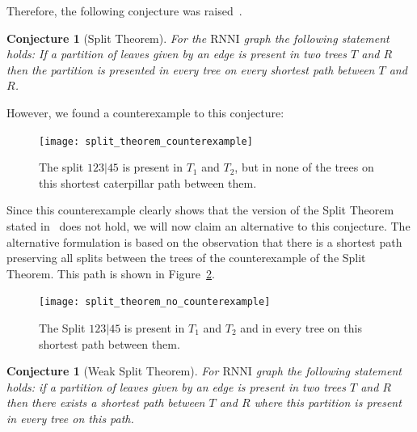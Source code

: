 \documentclass[11pt, a4paper]{article}
\newcommand{\rnni}{\mathrm{RNNI}}
\newtheorem{conjecture}[definition]{Conjecture}
\begin{document}
Therefore, the following conjecture was raised~\cite{Gavryushkin2017}.

\begin{conjecture}[Split Theorem]
	For the $\rnni$ graph the following statement holds:
	If a partition of leaves given by an edge is present in two trees $T$ and $R$ then the partition is presented in every tree on every shortest path between $T$ and $R$.
	\label{split_theorem}
\end{conjecture}

However, we found a counterexample to this conjecture:

\begin{figure}[H]
	\centering
	\texttt{[image: split\_theorem\_counterexample]}
	\caption{The split $123|45$ is present in $T_1$ and $T_2$, but in none of the trees on this shortest caterpillar path between them.}
	\label{split_theorem_counterexample}
\end{figure}

Since this counterexample clearly shows that the version of the Split Theorem stated in~\cite{Gavryushkin2017} does not hold, we will now claim an alternative to this conjecture.
The alternative formulation is based on the observation that there is a shortest path preserving all splits between the trees of the counterexample of the Split Theorem.
This path is shown in Figure~\ref{split_theorem_no_counterexample}.

\begin{figure}[H]
	\centering
	\texttt{[image: split\_theorem\_no\_counterexample]}
	\caption{The Split $123|45$ is present in $T_1$ and $T_2$ and in every tree on this shortest path between them.}
	\label{split_theorem_no_counterexample}
\end{figure}


\begin{conjecture}[Weak Split Theorem]
	For $\rnni$ graph the following statement holds:
	if a partition of leaves given by an edge is present in two trees $T$ and $R$ then there exists a shortest path between $T$ and $R$ where this partition is present in every tree on this path.
	\label{split_theorem_weak}
\end{conjecture}


\end{document}
